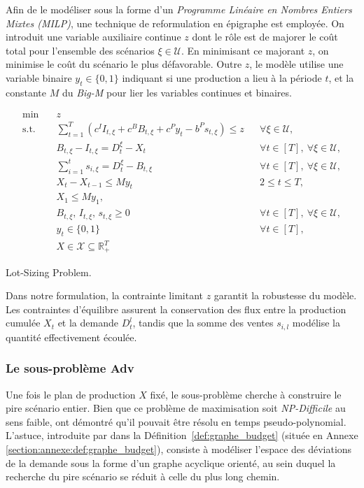 \documentclass[12pt, a4paper, twoside]{article}
\numberwithin{equation}{section}
\newcommand{\adv}{\textbf{Adv} }
\begin{document}
	Afin de le modéliser sous la forme d'un \textit{Programme Linéaire en Nombres Entiers Mixtes (MILP)}, une technique de reformulation en épigraphe est employée. On introduit une variable auxiliaire continue $z$ dont le rôle est de majorer le coût total pour l'ensemble des scénarios $\xi \in \mathcal{U}$. En minimisant ce majorant $z$, on minimise le coût du scénario le plus défavorable. Outre $z$, le modèle utilise une variable binaire $y_t\in \{0, 1\}$ indiquant si une production a lieu à la période $t$, et la constante $M$ du \textit{Big-M} pour lier les variables continues et binaires.

    {\small
    	\begin{align}
    		\label{Lot-Sizing-prb}
    		\min\quad & z \\
    		\text{s.t.}\quad & \sum_{t=1}^{T}\left(c^I I_{t,\xi} + c^B B_{t,\xi} + c^P y_t - b^P s_{t,\xi}\right) \le z &&  \forall\xi\in\mathcal{U},\\
    		& B_{t,\xi}-I_{t,\xi}=D_t^\xi-X_t && \forall t\in[T],\ \forall\xi\in\mathcal{U},\\
    		& \sum_{i=1}^{t}s_{i,\xi}=D_t^\xi-B_{t,\xi} && \forall t\in[T],\ \forall\xi\in\mathcal{U},\\
    		& X_t-X_{t-1}\le My_t && 2\le t\le T,\\
    		& X_1\le My_1,\\
    		& B_{t,\xi},\,I_{t,\xi},\,s_{t,\xi}\ge0 && \forall t\in[T],\ \forall\xi\in\mathcal{U},\\
    		& y_t\in\{0,1\} && \forall t\in[T],\\
    		& X\in\mathcal{X}\subseteq\mathbb{R}_+^T
    	\end{align}
	}
    
	\vspace{-0.5em}
	{\centering
		\small Lot-Sizing Problem. \cite{portoleauTHESIS}\par
		\label{formulation_probleme_maitre}
	}
	
	Dans notre formulation, la contrainte limitant $z$ garantit la robustesse du modèle. Les contraintes d'équilibre assurent la conservation des flux entre la production cumulée $X_t$ et la demande $D_t^l$, tandis que la somme des ventes $s_{i, l}$ modélise la quantité effectivement écoulée.
	
	\subsubsection{Le sous-problème \adv}
	
	Une fois le plan de production $X$ fixé, le sous-problème cherche à construire le pire scénario entier. Bien que ce problème de maximisation soit \textit{NP-Difficile} au sens faible, \cite{guillaume2020robustproductionplanningbudgeted} ont démontré qu'il pouvait être résolu en temps pseudo-polynomial. L'astuce, introduite par \cite{guillaume2020robustproductionplanningbudgeted} dans la Définition~\ref{def:graphe_budget} (située en Annexe \ref{section:annexe:def:graphe_budget}), consiste à modéliser l'espace des déviations de la demande sous la forme d'un graphe acyclique orienté, au sein duquel la recherche du pire scénario se réduit à celle du plus long chemin.
	
\end{document}
